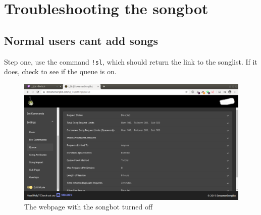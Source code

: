 
\section{Troubleshooting the songbot}

\subsection{Normal users cant add songs}

Step one, use the command \lstinline{!sl}, which should return the link to the songlist. If it does, check to see if the queue is on.
\begin{figure}[ht!]
  \includegraphics[width=\linewidth]{src/troubleshooting_songbot/bot_off.png}
  \caption{The webpage with the songbot turned off}
  \label{bot is off}
\end{figure}

